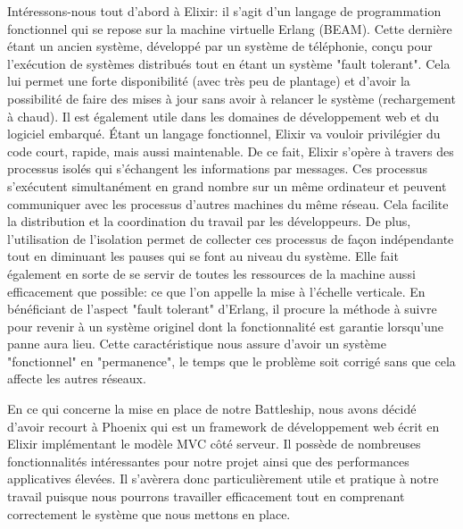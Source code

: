 \documentclass[12pt]{article}
\begin{document}
Intéressons-nous tout d'abord à Elixir\cite{elixir_doc}: il s'agit d'un langage de programmation fonctionnel qui se repose sur la machine virtuelle Erlang (BEAM). Cette dernière étant un ancien système, développé par un système de téléphonie, conçu pour l'exécution de systèmes distribués tout en étant un système "fault tolerant". Cela lui permet une forte disponibilité (avec très peu de plantage) et d'avoir la possibilité de faire des mises à jour sans avoir à relancer le système (rechargement à chaud). Il est également utile dans les domaines de développement web et du logiciel embarqué.
Étant un langage fonctionnel, Elixir va vouloir privilégier du code court, rapide, mais aussi maintenable\cite{elixir_video}. De ce fait, Elixir s'opère à travers des processus isolés qui s'échangent les informations par messages. Ces processus s'exécutent simultanément en grand nombre sur un même ordinateur et peuvent communiquer avec les processus d'autres machines du même réseau. Cela facilite la distribution et la coordination du travail par les développeurs. De plus, l'utilisation de l'isolation permet de collecter ces processus de façon indépendante tout en diminuant les pauses qui se font au niveau du système. Elle fait également en sorte de se servir de toutes les ressources de la machine aussi efficacement que possible: ce que l'on appelle la mise à l'échelle verticale.
En bénéficiant de l'aspect "fault tolerant" d'Erlang, il procure la méthode à suivre pour revenir à un système originel dont la fonctionnalité est garantie lorsqu'une panne aura lieu. Cette caractéristique nous assure d'avoir un système "fonctionnel" en "permanence", le temps que le problème soit corrigé sans que cela affecte les autres réseaux. 

En ce qui concerne la mise en place de notre Battleship, nous avons décidé d'avoir recourt à Phoenix\cite{phoenix} qui est un framework de développement web écrit en Elixir implémentant le modèle MVC côté serveur. Il possède de nombreuses fonctionnalités intéressantes pour notre projet ainsi que des performances applicatives élevées. Il s'avèrera donc particulièrement utile et pratique à notre travail puisque nous pourrons travailler efficacement tout en comprenant correctement le système que nous mettons en place.
\end{document}
